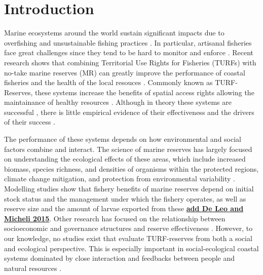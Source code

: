 \documentclass{frontiersSCNS}
\theoremstyle{definition}
\theoremstyle{definition}
\theoremstyle{definition}
\theoremstyle{remark}
\begin{document}
\clearpage

\section{Introduction}\label{introduction}

Marine ecosystems around the world sustain significant impacts due to
overfishing and unsustainable fishing practices
\citep{halpern_2008-dK,worm_2006-IB,pauly_2005-qV}. In particular,
artisanal fisheries face great challenges since they tend to be hard to
monitor and enforce \citep{costello_2012}. Recent research shows that
combining Territorial Use Rights for Fisheries (TURFs) with no-take
marine reserves (MR) can greatly improve the performance of coastal
fisheries and the health of the local resouces
\citep{costello_2010-Ix,lester_2017}. Commonly known as TURF-Reserves,
these systems increase the benefits of spatial access rights allowing
the maintainance of healthy resources
\citep{afflerbach_2014-HP,lester_2017}. Although in theory these systems
are successful \citep{costello_2010-Ix}, there is little empirical
evidence of their effectiveness and the drivers of their success
\citep{afflerbach_2014-HP,lester_2017}.

The performance of these systems depends on how environmental and social
factors combine and interact. The science of marine reserves has largely
focused on understanding the ecological effects of these areas, which
include increased biomass, species richness, and densities of organisms
within the protected regions, climate change mitigation, and protection
from environmental variability
\citep{lester_2009-Ks,giakoumi_2017-V2,sala_2017-69,roberts_2017-J9,micheli_2012-EU}.
Modelling studies show that fishery benefits of marine reserves depend
on initial stock status and the management under which the fishery
operates, as well as reserve size and the amount of larvae exported from
these \citep{hilborn_2006,krueck_2017-J1}
\href{http://dx.doi.org/10.1098/rstb.2014.0276}{\textbf{add De Leo and
Micheli 2015}}. Other research has focused on the relationship between
socioeconomic and governance structures and reserve effectiveness
\citep{halpern_2013,lpezangarita_2014,mascia_2017-m_}. However, to our
knowledge, no studies exist that evaluate TURF-reserves from both a
social and ecological perspective. This is especially important in
social-ecological coastal systems dominated by close interaction and
feedbacks between people and natural resources \citep{ostrom_2009-hg}.
\end{document}
